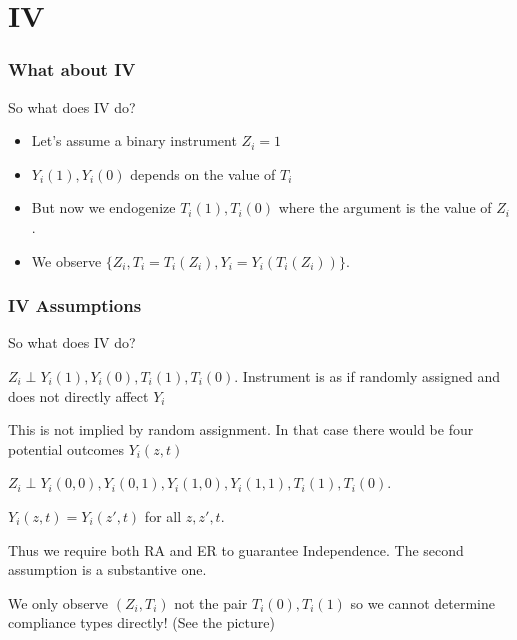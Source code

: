\section{IV}

\begin{frame}
\frametitle{What about IV}
So what does IV do?
\begin{itemize}
\item Let's assume a binary instrument $Z_i = 1$
\item $Y_i(1),Y_i(0)$ depends on the value of $T_i$
\item But now we endogenize $T_i(1) ,T_i(0)$ where the argument is the value of $Z_i$.
\item We observe $\{Z_i, T_i = T_i(Z_i), Y_i = Y_i(T_i(Z_i)) \}$.
\end{itemize}
\end{frame}

\begin{frame}
\frametitle{IV Assumptions}
So what does IV do?
\begin{description}
\item [Independence] $Z_i \perp Y_i(1), Y_i(0), T_i(1), T_i(0)$. Instrument is as if randomly assigned and does not directly affect $Y_i$
\item This is not implied by random assignment. In that case there would be four potential outcomes $Y_i(z,t)$
\item [Random Assignment] $Z_i \perp Y_i(0,0), Y_i(0,1), Y_i(1,0), Y_i(1,1), T_i(1), T_i(0)$. 
\item [Exclusion Restriction] $Y_i(z,t) = Y_i(z',t)$ for all $z,z',t$. 
\item Thus we require both RA and ER to guarantee Independence. The second assumption is a substantive one.
\item We only observe $(Z_i,T_i)$ not the pair $T_i(0),T_i(1)$ so we cannot determine compliance types directly! (See the picture)
\end{description}
\end{frame}


